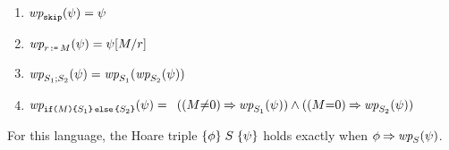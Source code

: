   \begin{enumerate}[,label=(\textsc{d}\arabic*),ref=\textsc{d}\arabic*]
  \item
    \begin{math}
      \fwp{\SKIP}{\bForm} = \bForm
    \end{math}
  \item \label{wp-let}
    $\fwp{\LET{\aReg}{\aExp}}{\bForm} = \bForm[\aExp/\aReg]$
  \item
    \begin{math}
      \fwp{\aCmd_1;\aCmd_2}{\bForm} = \fwp{\aCmd_1}{\fwp{\aCmd_2}{\bForm}}
    \end{math}
  \item
    \begin{math}
      \fwp{\IF{\aExp}\THEN \aCmd_1\ELSE \aCmd_2\FI}{\bForm}= {}
    \end{math}
    \begin{math}
      ((\aExp{\ne}0) \limplies \fwp{\aCmd_1}{\bForm}) \land
      ((\aExp{=}0) \limplies \fwp{\aCmd_2}{\bForm})
    \end{math}
  \end{enumerate}
For this language, the Hoare triple
$\{\phi\}\allowbreak\;S\;\allowbreak\{\psi\}$ holds exactly when $\aForm \limplies
\fwp{\aCmd}{\bForm}$.
